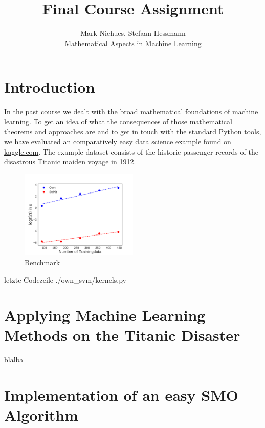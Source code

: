 \documentclass[12pt]{scrartcl}
\begin{document}
 
 
 
\title{Final Course Assignment \\ }%
\author{Mark Niehues, Stefaan Hessmann \\ %
Mathematical Aspects in Machine Learning} %

\maketitle
 
\section{Introduction}
In the past course we dealt with the broad mathematical foundations of machine learning. To get an idea of what the consequences of those mathematical theorems and approaches are and to get in touch with the standard Python tools, we have evaluated an comparatively easy data science example found on \url{kaggle.com}. The example dataset \cite{Kaggle2017} consists of the historic passenger records of the disastrous Titanic maiden voyage in 1912. 

\begin{figure}
  \centering
    \includegraphics[width=0.5\textwidth]{media_saved/benchmark}
  \caption{Benchmark}
  \label{fig:gull}
\end{figure}

 letzte Codezeile
{./own_svm/kernels.py}


\section{Applying Machine Learning Methods on the Titanic Disaster}
blalba
\section{Implementation of an easy SMO Algorithm}

\printbibliography %
\end{document}
